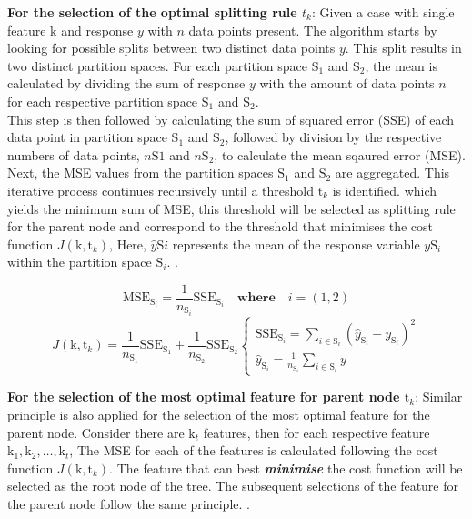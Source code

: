 \textbf{For the selection of the optimal splitting rule $t_k$}: Given a case with single feature $\text{k}$ and response $y$ with $n$ data points present. The algorithm starts by looking for possible splits between two distinct data points $y$. This split results in two distinct partition spaces. For each partition space $\text{S}_1$ and $\text{S}_2$, the mean is calculated by dividing the sum of response $y$ with the amount of data points $n$ for each respective partition space $\text{S}_1$ and $\text{S}_2$.\\ 

This step is then followed by calculating the sum of squared error (SSE) of each data point in partition space $\text{S}_1$ and $\text{S}_2$, followed by division by the respective numbers of data points, $n{\text{S}1}$ and $n{\text{S}_2}$, to calculate the mean sqaured error (MSE). Next, the MSE values from the partition spaces $\text{S}_1$ and $\text{S}_2$ are aggregated. This iterative process continues recursively until a threshold $\text{t}_k$ is identified. which yields the minimum sum of MSE, this threshold will be selected as splitting rule for the parent node and correspond to the threshold that minimises the cost function $J(\text{k},\text{t}_k)$, Here, $\hat{y}{\text{S}i}$ represents the mean of the response variable $y{\text{S}_i}$ within the partition space $\text{S}_i$. .

\begin{equation}\label{eqn:sse}
    \text{MSE}_{\text{S}_i} = \frac{1}{n_{\text{S}_i}}\text{SSE}_{\text{S}_i} \quad \textbf{where} \quad i = (1,2)   
\end{equation}
\begin{equation}\label{eqn:costfun}
    J(\text{k},\text{t}_k) = \frac{1}{n_{\text{S}_1}}\text{SSE}_{\text{S}_1} + \frac{1}{n_{\text{S}_2}}\text{SSE}_{\text{S}_2}
    \begin{cases}
        \text{SSE}_{\text{S}_i} = \sum\limits_{i \in \text{S}_i}(\hat{y}_{\text{S}_i} - y_{\text{S}_i} )^2 \\
        \hat{y}_{\text{S}_i} = \frac{1}{n_{\text{S}_i}}\sum\limits_{i\in \text{S}_i} y
    \end{cases}  
\end{equation}

\textbf{For the selection of the most optimal feature for parent node $\text{t}_k$}: Similar principle is also applied for the selection of the most optimal feature for the parent node. Consider there are $\text{k}_t$ features, then for each respective feature $\text{k}_1,\text{k}_2,\dots,\text{k}_t$, The MSE for each of the features is calculated following the cost function $J(\text{k},\text{t}_k)$. The feature that can best \emph{\textbf{minimise}} the cost function will be selected as the root node of the tree. The subsequent selections of the feature for the parent node follow the same principle. .\\


